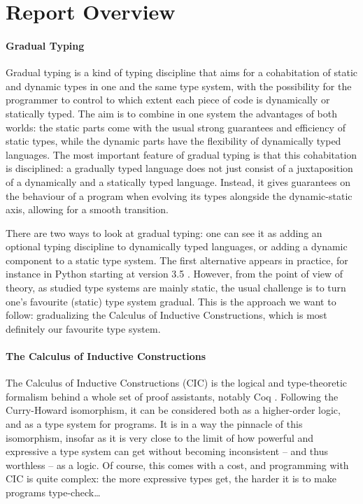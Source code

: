 \documentclass[en]{myarticle}
\DeclareMathOperator{\?}{?}
\begin{document}
{\tableofcontents

\section*{Report Overview}


\paragraph{Gradual Typing}
Gradual typing is a kind of typing discipline that aims for a cohabitation of static and dynamic types in one and the same type system, with the possibility for the programmer to control to which extent each piece of code is dynamically or statically typed. The aim is to combine in one system the advantages of both worlds: the static parts come with the usual strong guarantees and efficiency of static types, while the dynamic parts have the flexibility of dynamically typed languages. The most important feature of gradual typing is that this cohabitation is disciplined: a gradually typed language does not just consist of a juxtaposition of a dynamically and a statically typed language. Instead, it gives guarantees on the behaviour of a program when evolving its types alongside the dynamic-static axis, allowing for a smooth transition.

There are two ways to look at gradual typing: one can see it as adding an optional typing discipline to dynamically typed languages, or adding a dynamic component to a static type system. The first alternative appears in practice, for instance in Python starting at version 3.5 \cite{Rossum2014}. However, from the point of view of theory, as studied type systems are mainly static, the usual challenge is to turn one's favourite (static) type system gradual. This is the approach we want to follow: gradualizing the Calculus of Inductive Constructions, which is most definitely our favourite type system.

\paragraph{The Calculus of Inductive Constructions}
The Calculus of Inductive Constructions (CIC) is the logical and type-theoretic formalism behind a whole set of proof assistants, notably Coq \cite{CoqMan}. Following the Curry-Howard isomorphism, it can be considered both as a higher-order logic, and as a type system for programs. It is in a way the pinnacle of this isomorphism, insofar as it is very close to the limit of how powerful and expressive a type system can get without becoming inconsistent – and thus worthless – as a logic. Of course, this comes with a cost, and programming with CIC is quite complex: the more expressive types get, the harder it is to make programs type-check…

}
\end{document}
